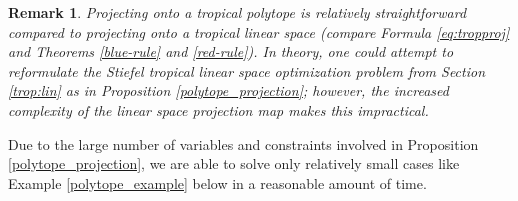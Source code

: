\documentclass[12pt]{extarticle}
\numberwithin{theorem}{section}
\newtheorem{remark}[theorem]{Remark}
\begin{document}
\begin{remark}
Projecting onto a tropical polytope is relatively straightforward compared to projecting onto a tropical linear space (compare Formula \ref{eq:tropproj} and Theorems \ref{blue-rule} and \ref{red-rule}). In theory, one could attempt to reformulate the Stiefel tropical linear space optimization problem from Section \ref{trop:lin} as in Proposition \ref{polytope_projection}; however, the increased complexity of the linear space projection map makes this impractical.
\end{remark}

Due to the large number of variables and constraints involved in Proposition \ref{polytope_projection}, we are able to solve only relatively small cases like Example \ref{polytope_example} below in a reasonable amount of time.
\end{document}
